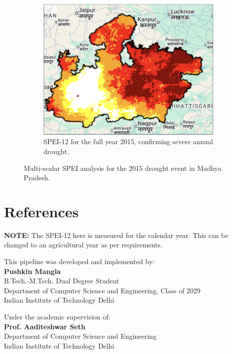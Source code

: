 \documentclass[12pt, a4paper]{article}
\begin{document}
\begin{figure}[h!]
    \begin{subfigure}[b]{0.6\textwidth}
        \centering
        \includegraphics[width=\textwidth]{spei_annual_2015.png}
        \caption{SPEI-12 for the full year 2015, confirming severe annual drought.}
        \label{fig:2015_annual}
    \end{subfigure}
    \caption{Multi-scalar SPEI analysis for the 2015 drought event in Madhya Pradesh.}
    \label{fig:2015_results}
\end{figure}

\clearpage %

\section{References}
\printbibliography

\vspace{1cm}
\noindent \textbf{NOTE:} The SPEI-12 here is measured for the calendar year. This can be changed to an
agricultural year as per requirements.

\newpage

\noindent This pipeline was developed and implemented by: \\
\textbf{Pushkin Mangla} \\
B.Tech.-M.Tech. Dual Degree Student \\
Department of Computer Science and Engineering, Class of 2029 \\
Indian Institute of Technology Delhi

\vspace{1cm}

\noindent Under the academic supervision of: \\
\textbf{Prof. Aaditeshwar Seth} \\
Department of Computer Science and Engineering \\
Indian Institute of Technology Delhi
\end{document}
